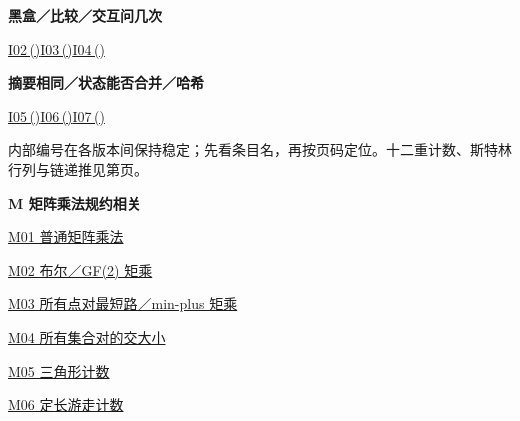 \documentclass[10pt,a4paper]{article}
\newcommand{\grouphead}[1]{\needspace{7\baselineskip}\par\vspace{7pt}{\large\bfseries #1}\par\vspace{5pt}}
\begin{document}
\begin{minipage}{\linewidth}\textbf{黑盒／比较／交互问几次}\par{\fontsize{9.5}{12}\selectfont \hyperref[I02]{I02\,(\pageref*{I02})}\hspace{.5em}\allowbreak \hyperref[I03]{I03\,(\pageref*{I03})}\hspace{.5em}\allowbreak \hyperref[I04]{I04\,(\pageref*{I04})}}\end{minipage}\par\vspace{5pt}
\begin{minipage}{\linewidth}\textbf{摘要相同／状态能否合并／哈希}\par{\fontsize{9.5}{12}\selectfont \hyperref[I05]{I05\,(\pageref*{I05})}\hspace{.5em}\allowbreak \hyperref[I06]{I06\,(\pageref*{I06})}\hspace{.5em}\allowbreak \hyperref[I07]{I07\,(\pageref*{I07})}}\end{minipage}\par\vspace{5pt}
\clearpage
{}\grouphead{完整条目目录}
内部编号在各版本间保持稳定；先看条目名，再按页码定位。十二重计数、斯特林行列与链递推见第\pageref*{tables}页。\par
\begingroup\fontsize{10}{13}\selectfont
{}\par\vspace{6pt}\textbf{M 矩阵乘法规约相关}\par\vspace{3pt}
\noindent\hyperref[M01]{M01 普通矩阵乘法\nobreak\hfill\pageref*{M01}}\par\vspace{1.5pt}
\noindent\hyperref[M02]{M02 布尔／GF(2) 矩乘\nobreak\hfill\pageref*{M02}}\par\vspace{1.5pt}
\noindent\hyperref[M03]{M03 所有点对最短路／min-plus 矩乘\nobreak\hfill\pageref*{M03}}\par\vspace{1.5pt}
\noindent\hyperref[M04]{M04 所有集合对的交大小\nobreak\hfill\pageref*{M04}}\par\vspace{1.5pt}
\noindent\hyperref[M05]{M05 三角形计数\nobreak\hfill\pageref*{M05}}\par\vspace{1.5pt}
\noindent\hyperref[M06]{M06 定长游走计数\nobreak\hfill\pageref*{M06}}\par\vspace{1.5pt}
\end{document}
